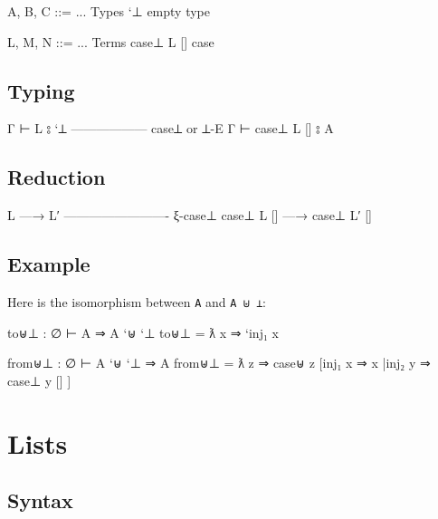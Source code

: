 \begin{myDisplay}
A, B, C ::= ...                     Types
  `⊥                                  empty type

L, M, N ::= ...                     Terms
  case⊥ L []                          case
\end{myDisplay}

\hypertarget{typing-7}{%
\subsection{Typing}\label{typing-7}}

\begin{myDisplay}
Γ ⊢ L ⦂ `⊥
------------------ case⊥ or ⊥-E
Γ ⊢ case⊥ L [] ⦂ A
\end{myDisplay}

\hypertarget{reduction-7}{%
\subsection{Reduction}\label{reduction-7}}

\begin{myDisplay}
L —→ L′
------------------------- ξ-case⊥
case⊥ L [] —→ case⊥ L′ []
\end{myDisplay}

\hypertarget{example-7}{%
\subsection{Example}\label{example-7}}

Here is the isomorphism between \texttt{A} and
\texttt{A\ \textasciigrave{}⊎\ \textasciigrave{}⊥}:

\begin{myDisplay}
to⊎⊥ : ∅ ⊢ A ⇒ A `⊎ `⊥
to⊎⊥ = ƛ x ⇒ `inj₁ x

from⊎⊥ : ∅ ⊢ A `⊎ `⊥ ⇒ A
from⊎⊥ = ƛ z ⇒ case⊎ z
                 [inj₁ x ⇒ x
                 |inj₂ y ⇒ case⊥ y
                             [] ]
\end{myDisplay}

\hypertarget{lists}{%
\section{Lists}\label{lists}}

\hypertarget{syntax-8}{%
\subsection{Syntax}\label{syntax-8}}

